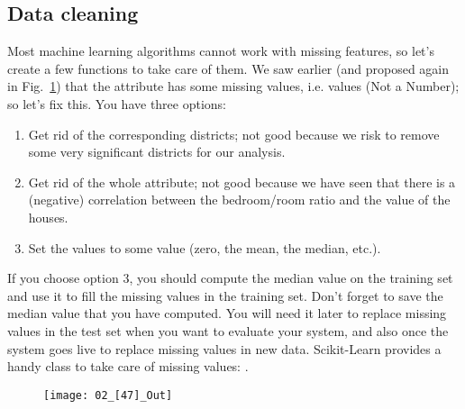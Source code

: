 \subsection{Data cleaning}
Most machine learning algorithms cannot work with missing features, so let's create a few functions to take care of them. We saw earlier (and proposed again in Fig.~\ref{02_[47]_Out}) that the  attribute has some missing values, i.e.  values (Not a Number); so let's fix this. You have three options:
\begin{enumerate}
\item Get rid of the corresponding districts; not good because we risk to remove some very significant districts for our analysis.
\item Get rid of the whole attribute; not good because we have seen that there is a (negative) correlation between the bedroom/room ratio and the value of the houses.
\item Set the values to some value (zero, the mean, the median, etc.).
\end{enumerate}
If you choose option 3, you should compute the median value on the training set and use it to fill the missing values in the training set. Don't forget to save the median value that you have computed. You will need it later to replace missing values in the test set when you want to evaluate your system, and also once the system goes live to replace missing values in new data. Scikit-Learn provides a handy class to take care of missing values: .
\begin{figure}[h!t]
\centering
\vspace{2pt}\texttt{[image: 02\_[47]\_Out]}
\caption{}\label{02_[47]_Out}
\end{figure}
